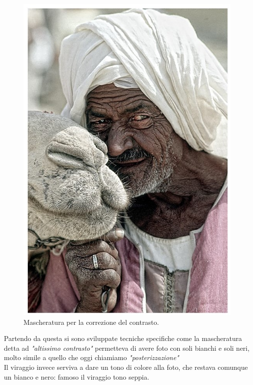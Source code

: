 \begin{figure}[htb]
\includegraphics[scale=4]{Pictures/analogico_filtrata.jpg}
\caption{Mascheratura per la correzione del contrasto. \cite{fodde}}
\end{figure}

\noindent
Partendo da questa si sono sviluppate tecniche specifiche come la mascheratura detta ad \textit{"altissimo contrasto"} permetteva di avere foto con soli bianchi e soli neri, molto simile a quello che oggi chiamiamo \textit{"posterizzazione"}\\ 
Il viraggio invece serviva a dare un tono di colore alla foto, che restava comunque
un bianco e nero: famoso il viraggio tono seppia.




